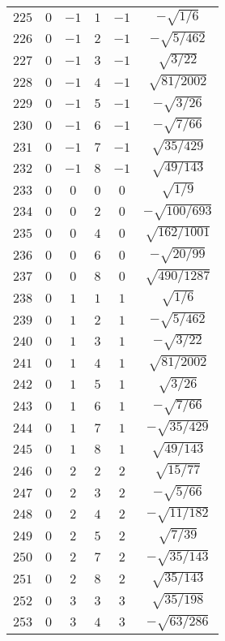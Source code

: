 \begin{table}
\begin{center}
\begin{tabular}{|c|c|c|c|c|c|}
$225$ & $0$ & $-1$ & $1$ & $-1$ & $-\sqrt{1/6}$ \\ 
$226$ & $0$ & $-1$ & $2$ & $-1$ & $-\sqrt{5/462}$ \\ 
$227$ & $0$ & $-1$ & $3$ & $-1$ & $\sqrt{3/22}$ \\ 
$228$ & $0$ & $-1$ & $4$ & $-1$ & $\sqrt{81/2002}$ \\ 
$229$ & $0$ & $-1$ & $5$ & $-1$ & $-\sqrt{3/26}$ \\ 
$230$ & $0$ & $-1$ & $6$ & $-1$ & $-\sqrt{7/66}$ \\ 
$231$ & $0$ & $-1$ & $7$ & $-1$ & $\sqrt{35/429}$ \\ 
$232$ & $0$ & $-1$ & $8$ & $-1$ & $\sqrt{49/143}$ \\ 
$233$ & $0$ & $0$ & $0$ & $0$ & $\sqrt{1/9}$ \\ 
$234$ & $0$ & $0$ & $2$ & $0$ & $-\sqrt{100/693}$ \\ 
$235$ & $0$ & $0$ & $4$ & $0$ & $\sqrt{162/1001}$ \\ 
$236$ & $0$ & $0$ & $6$ & $0$ & $-\sqrt{20/99}$ \\ 
$237$ & $0$ & $0$ & $8$ & $0$ & $\sqrt{490/1287}$ \\ 
$238$ & $0$ & $1$ & $1$ & $1$ & $\sqrt{1/6}$ \\ 
$239$ & $0$ & $1$ & $2$ & $1$ & $-\sqrt{5/462}$ \\ 
$240$ & $0$ & $1$ & $3$ & $1$ & $-\sqrt{3/22}$ \\ 
$241$ & $0$ & $1$ & $4$ & $1$ & $\sqrt{81/2002}$ \\ 
$242$ & $0$ & $1$ & $5$ & $1$ & $\sqrt{3/26}$ \\ 
$243$ & $0$ & $1$ & $6$ & $1$ & $-\sqrt{7/66}$ \\ 
$244$ & $0$ & $1$ & $7$ & $1$ & $-\sqrt{35/429}$ \\ 
$245$ & $0$ & $1$ & $8$ & $1$ & $\sqrt{49/143}$ \\ 
$246$ & $0$ & $2$ & $2$ & $2$ & $\sqrt{15/77}$ \\ 
$247$ & $0$ & $2$ & $3$ & $2$ & $-\sqrt{5/66}$ \\ 
$248$ & $0$ & $2$ & $4$ & $2$ & $-\sqrt{11/182}$ \\ 
$249$ & $0$ & $2$ & $5$ & $2$ & $\sqrt{7/39}$ \\ 
$250$ & $0$ & $2$ & $7$ & $2$ & $-\sqrt{35/143}$ \\ 
$251$ & $0$ & $2$ & $8$ & $2$ & $\sqrt{35/143}$ \\ 
$252$ & $0$ & $3$ & $3$ & $3$ & $\sqrt{35/198}$ \\ 
$253$ & $0$ & $3$ & $4$ & $3$ & $-\sqrt{63/286}$ \\ 

\end{tabular}
\end{center}
\end{table}

